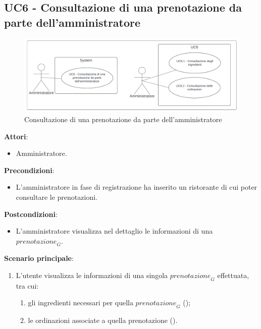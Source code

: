 \subsection{UC6 - Consultazione di una prenotazione da parte dell'amministratore}\label{usecase:6}
\begin{figure}[H]
  \centering
  \includegraphics[width=1\textwidth]{ucd/UCD6_new.png}
\caption{Consultazione di una prenotazione da parte dell'amministratore}
\end{figure}
\textbf{Attori}:
\begin{itemize}
    \item Amministratore.
\end{itemize}
\textbf{Precondizioni}:
\begin{itemize}
    \item L'amministratore in fase di registrazione ha inserito un ristorante di cui poter consultare le prenotazioni.
\end{itemize}
\textbf{Postcondizioni}:
\begin{itemize}
    \item L'amministratore visualizza nel dettaglio le informazioni di una $\textit{prenotazione}_G$.
\end{itemize}
\textbf{Scenario principale}:
\begin{enumerate}
    \item L'utente visualizza le informazioni di una singola $\textit{prenotazione}_G$ effettuata, tra cui:
    \begin{enumerate}
        \item gli ingredienti necessari per quella $\textit{prenotazione}_G$ ();
        \item le ordinazioni associate a quella prenotazione
        ().
    \end{enumerate}
\end{enumerate}